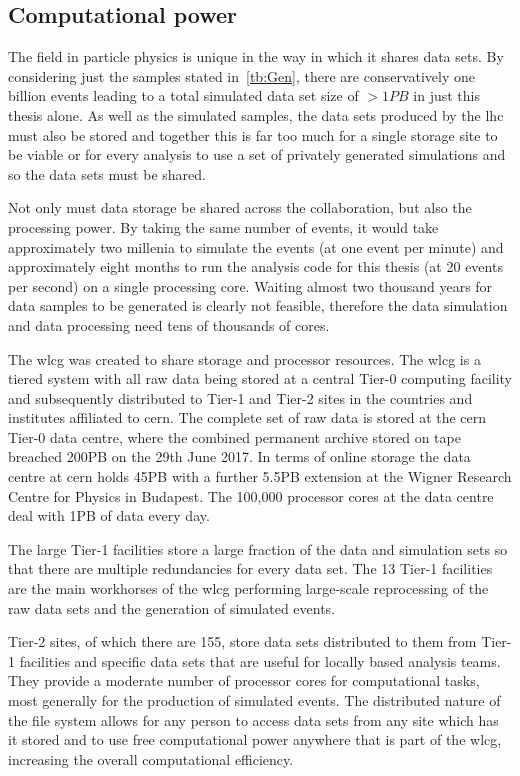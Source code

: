 \subsection{Computational power} %
\label{sub:computational_power}

The field in particle physics is unique in the way in which it shares data sets.
By considering just the samples stated in~\ref{tb:Gen}, there are conservatively one billion events leading to a total simulated data set size of $>1\unit{PB}$ in just this thesis alone.
As well as the simulated samples, the data sets produced by the \acrshort{lhc} must also be stored and together this is far too much for a single storage site to be viable or for every analysis to use a set of privately generated simulations and so the data sets must be shared.

Not only must data storage be shared across the collaboration, but also the processing power.
By taking the same number of events, it would take approximately two millenia to simulate the events (at one event per minute) and approximately eight months to run the analysis code for this thesis (at 20 events per second) on a single processing core.
Waiting almost two thousand years for data samples to be generated is clearly not feasible, therefore the data simulation and data processing need tens of thousands of cores. 

The \acrfull{wlcg} was created to share storage and processor resources.
The \acrshort{wlcg} is a tiered system with all raw data being stored at a central Tier-0 computing facility and subsequently distributed to Tier-1 and Tier-2 sites in the countries and institutes affiliated to \acrshort{cern}.
The complete set of raw data is stored at the \acrshort{cern} Tier-0 data centre, where the combined permanent archive stored on tape breached 200\unit{PB} on the 29th June 2017.
In terms of online storage the data centre at \acrshort{cern} holds 45\unit{PB} with a further 5.5\unit{PB} extension at the Wigner Research Centre for Physics in Budapest.
The 100,000 processor cores at the data centre deal with 1\unit{PB} of data every day.

The large Tier-1 facilities store a large fraction of the data and simulation sets so that there are multiple redundancies for every data set.
The 13 Tier-1 facilities are the main workhorses of the \acrshort{wlcg} performing large-scale reprocessing of the raw data sets and the generation of simulated events.

Tier-2 sites, of which there are 155, store data sets distributed to them from Tier-1 facilities and specific data sets that are useful for locally based analysis teams.
They provide a moderate number of processor cores for computational tasks, most generally for the production of simulated events.
The distributed nature of the file system allows for any person to access data sets from any site which has it stored and to use free computational power anywhere that is part of the \acrshort{wlcg}, increasing the overall computational efficiency.

